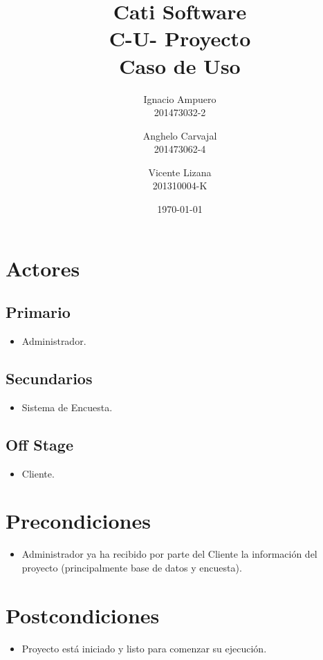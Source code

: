 \documentclass[fleqn]{article}
\title{\huge Cati Software\\ \Huge C-U- Proyecto \\ \Large Caso de Uso \vspace{30pt}}
\author{Ignacio Ampuero\\ 201473032-2 \and Anghelo Carvajal\\ 201473062-4 \and Vicente Lizana\\ 201310004-K}
\date{\today}
\begin{document}
\maketitle
\vspace{30pt}

\section{Actores}

	\subsection{Primario}
	
	\begin{itemize}
		\item Administrador.
	\end{itemize}
	
	\subsection{Secundarios}
	
	\begin{itemize}
		\item Sistema de Encuesta.
	\end{itemize}		
	
	\subsection{Off Stage}
	
	\begin{itemize}
		\item Cliente.
	\end{itemize}

\section{Precondiciones}

\begin{itemize}
	\item Administrador ya ha recibido por parte del Cliente la información del proyecto (principalmente base de datos y encuesta).
\end{itemize}

\section{Postcondiciones}

\begin{itemize}
	\item Proyecto está iniciado y listo para comenzar su ejecución.
\end{itemize}
\end{document}
